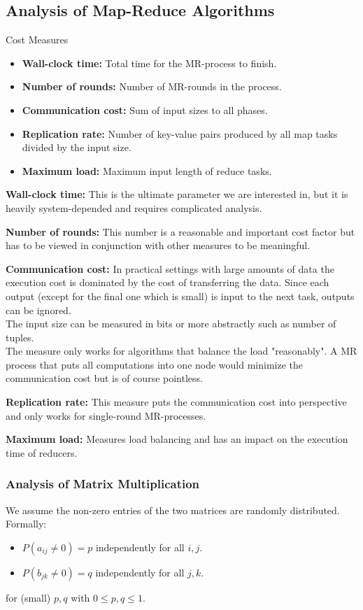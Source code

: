 \documentclass[english]{panikzettel}
\begin{document}
\subsection{Analysis of Map-Reduce Algorithms}
\begin{defi}{Cost Measures}
\begin{itemize}[leftmargin=*]
	\item \textbf{Wall-clock time:} Total time for the MR-process to finish.
	\item \textbf{Number of rounds:} Number of MR-rounds in the process.
	\item \textbf{Communication cost:} Sum of input sizes to all phases.
	\item \textbf{Replication rate:} Number of key-value pairs produced by all map tasks divided by the input size.
	\item \textbf{Maximum load:} Maximum input length of reduce tasks.
\end{itemize}
\end{defi}

\textbf{Wall-clock time:} This is the ultimate parameter we are interested in, but it is heavily system-depended and requires complicated analysis.

\textbf{Number of rounds:} This number is a reasonable and important cost factor but has to be viewed in conjunction with other measures to be meaningful.

\textbf{Communication cost:} In practical settings with large amounts of data the execution cost is dominated by the cost of transferring the data.
Since each output (except for the final one which is small) is input to the next task, outputs can be ignored.\\
The input size can be measured in bits or more abstractly such as number of tuples.\\
The measure only works for algorithms that balance the load "reasonably". A MR process that puts all computations into one node would minimize the communication cost but is of course pointless.

\textbf{Replication rate:} This measure puts the communication cost into perspective and only works for single-round MR-processes.

\textbf{Maximum load:} Measures load balancing and has an impact on the execution time of reducers.


\subsubsection{Analysis of Matrix Multiplication}
We assume the non-zero entries of the two matrices are randomly distributed.
Formally:
\begin{itemize}
\item $P(a_{ij}\neq 0)=p$ independently for all $i,j$.
\item $P(b_{jk}\neq 0)=q$ independently for all $j,k$.
\end{itemize}
for (small) $p, q$ with $0 \leq p, q \leq 1$.
\end{document}

